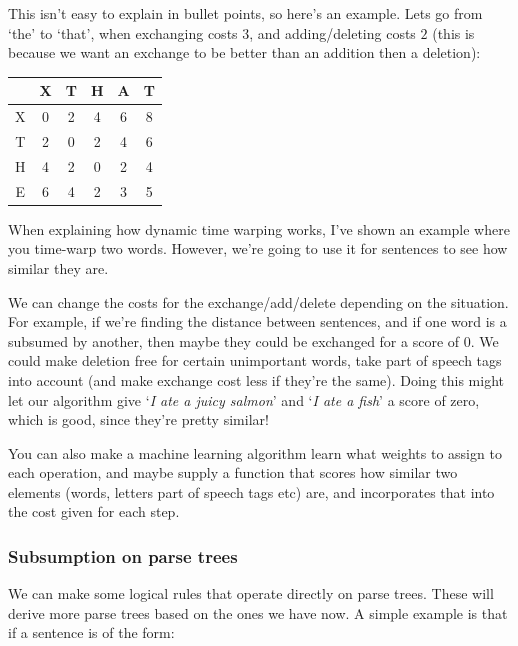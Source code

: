 
This isn't easy to explain in bullet points, so here's an example. Lets go from
`the' to `that', when exchanging costs $3$, and adding/deleting costs $2$ (this
is because we want an exchange to be better than an addition then a deletion):


\begin{center}
  \begin{tabular}{c|c c c c c}
      & X & T & H & A & T\\ \hline
    X & 0 & 2 & 4 & 6 & 8\\ 
    T & 2 & 0 & 2 & 4 & 6\\
    H & 4 & 2 & 0 & 2 & 4\\
    E & 6 & 4 & 2 & 3 & 5
  \end{tabular}
\end{center}

When explaining how dynamic time warping works, I've shown an example where you
time-warp two words. However, we're going to use it for sentences to see how
similar they are.

We can change the costs for the exchange/add/delete depending on the  situation.
For example, if we're finding the distance between sentences, and if  one word
is a subsumed by another, then maybe they could be exchanged for a  score of
$0$. We could make deletion free for certain unimportant words, take part of
speech tags into account (and make exchange cost less if they're the same).
Doing this might let our algorithm give `\textit{I ate a juicy salmon}' and
`\textit{I ate a fish}' a score of zero, which is good, since they're pretty
similar!

You can also make a machine learning algorithm learn what weights to assign to
each operation, and maybe supply a function that scores how similar two elements
(words, letters part of speech tags etc) are, and incorporates that into the
cost given for each step.

\subsubsection{Subsumption on parse trees}

We can make some logical rules that operate directly on parse trees. These will
derive more parse trees based on the ones we have now. A simple example is that
if a sentence is of the form:

